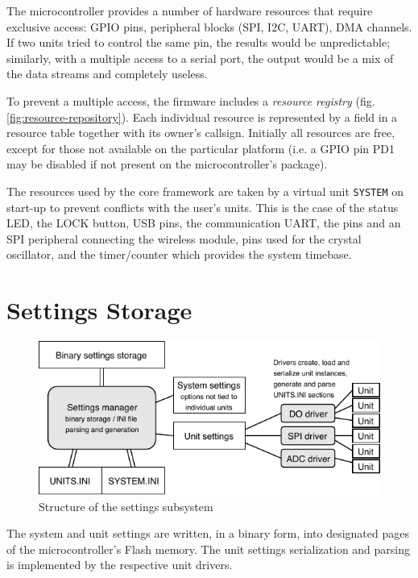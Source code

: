 The microcontroller provides a number of hardware resources that require exclusive access: GPIO pins, peripheral blocks (SPI, I2C, UART\textellipsis), DMA channels. If two units tried to control the same pin, the results would be unpredictable; similarly, with a multiple access to a serial port, the output would be a mix of the data streams and completely useless. 

To prevent a multiple access, the firmware includes a \textit{resource registry} (fig. \ref{fig:resource-repository}). Each individual resource is represented by a field in a resource table together with its owner's callsign. Initially all resources are free, except for those not available on the particular platform (i.e. a GPIO pin PD1 may be disabled if not present on the microcontroller's package). 

The resources used by the core framework are taken by a virtual unit \verb|SYSTEM| on start-up to prevent conflicts with the user's units. This is the case of the status LED, the LOCK button, USB pins, the communication UART, the pins and an SPI peripheral connecting the wireless module, pins used for the crystal oscillator, and the timer/counter which provides the system timebase.


\section{Settings Storage} \label{sec:settings-storage}

\begin{figure}[h]
	\centering
	\includegraphics[scale=1] {img/settings-storage.pdf}
	\caption{\label{fig:settings-storage}Structure of the settings subsystem}
\end{figure}

The system and unit settings are written, in a binary form, into designated pages of the microcontroller's Flash memory. The unit settings serialization and parsing is implemented by the respective unit drivers.

